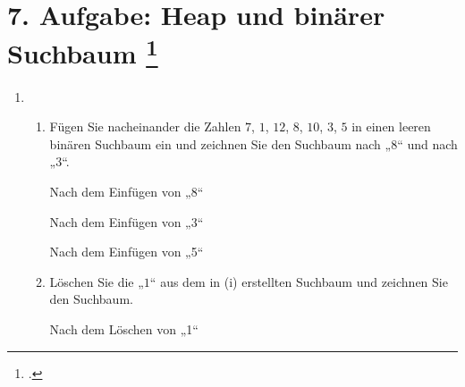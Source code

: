 \documentclass{bschlangaul-aufgabe}
\begin{document}
\section{7. Aufgabe: Heap und binärer Suchbaum
\footcite{examen:66115:2013:09}}

\begin{enumerate}

\item \strut

\begin{enumerate}


\item Fügen Sie nacheinander die Zahlen $7$, $1$, $12$, $8$, $10$, $3$,
$5$ in einen leeren binären Suchbaum ein und zeichnen Sie den Suchbaum
nach „$8$“ und nach „$3$“.

\begin{bBaum}{Nach dem Einfügen von „8“}
\end{bBaum}

\begin{bBaum}{Nach dem Einfügen von „3“}
\end{bBaum}

\begin{bBaum}{Nach dem Einfügen von „5“}
\end{bBaum}


\item Löschen Sie die „$1$“ aus dem in (i) erstellten Suchbaum und
zeichnen Sie den Suchbaum.

\begin{bBaum}{Nach dem Löschen von „1“}
\end{bBaum}


\end{enumerate}
\end{enumerate}
\end{document}
